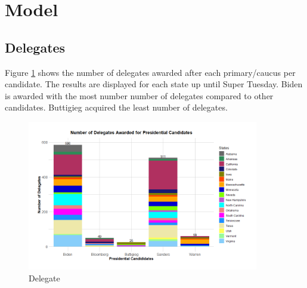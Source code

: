 \section{Model}\label{model}
\subsection{Delegates}
Figure \ref{Delegate} shows the number of delegates awarded after each primary/caucus per candidate. The results are displayed for each state up until Super Tuesday. Biden is awarded with the most number number of delegates compared to other candidates. Buttigieg acquired the least number of delegates. 
\begin{figure}[H]
    \centering
    \includegraphics[width=0.9\textwidth]{figures/Delegate.png}
    \caption{Delegate}
    \label{Delegate}
\end{figure}

